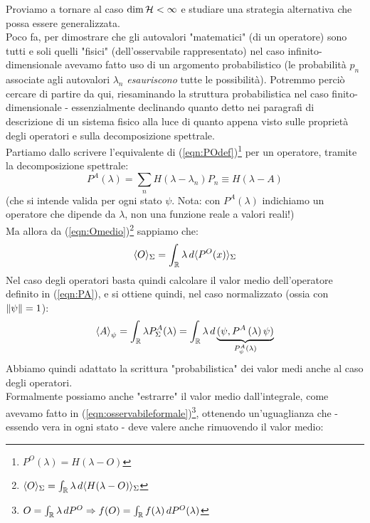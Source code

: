 Proviamo a tornare al caso $\operatorname{dim}\mathcal{H} < \infty$ e studiare una strategia alternativa che possa essere generalizzata.\\
Poco fa, per dimostrare che gli autovalori "matematici" (di un operatore) sono tutti e soli quelli "fisici" (dell'osservabile rappresentato) nel caso infinito-dimensionale avevamo fatto uso di un argomento probabilistico (le probabilità $p_n$ associate agli autovalori $\lambda_n$ \textit{esauriscono} tutte le possibilità). Potremmo perciò cercare di partire da qui, riesaminando la struttura probabilistica nel caso finito-dimensionale - essenzialmente declinando quanto detto nei paragrafi di descrizione di un sistema fisico %
alla luce di quanto appena visto sulle proprietà degli operatori e sulla decomposizione spettrale.\\
Partiamo dallo scrivere l'equivalente di (\ref{eqn:POdef})\footnote{$P^O(\lambda) = H(\lambda-O)$} per un operatore, tramite la decomposizione spettrale: %
\begin{equation} 
P^A\left(\lambda\right)=\sum_{n}{H\left(\lambda-\lambda_n\right)P_n}\equiv H(\lambda-A) 
\label{eqn:PA}
\end{equation}
(che si intende valida per ogni stato $\psi$. Nota: con $P^A(\lambda)$ indichiamo un operatore che dipende da $\lambda$, non una funzione reale a valori reali!)\\
Ma allora da (\ref{eqn:Omedio})\footnote{$\langle O \rangle_\Sigma = \int_{\mathbb{R}} \lambda\, d\langle H(\lambda-O)\rangle_\Sigma$} sappiamo che: %
\[
\langle O \rangle_\Sigma = \int_{\mathbb{R}} \lambda\, d\langle P^O(x)\rangle_\Sigma 
\]
Nel caso degli operatori basta quindi calcolare il valor medio dell'operatore definito in (\ref{eqn:PA}), e si ottiene quindi, nel caso normalizzato (ossia con $\left\lVert\psi\right\rVert = 1$):
\begin{equation}
\left\langle A\right\rangle_\psi= \int_{\mathbb{R}} \lambda P^A_\Sigma(\lambda) =\int_{\mathbb{R}}{\lambda\, d \underbrace{(\psi,P^A\left(\lambda\right)\psi)}_{P_\psi^A(\lambda)}}
\label{eqn:valormedioA}
\end{equation}
Abbiamo quindi adattato la scrittura "probabilistica" dei valor medi anche al caso degli operatori.\\
Formalmente possiamo anche "estrarre" il valor medio dall'integrale, come avevamo fatto in (\ref{eqn:osservabileformale})\footnote{$O = \int_{\mathbb{R}} \lambda\, dP^O \Rightarrow f(O) = \int_{\mathbb{R}} f(\lambda)\, dP^O(\lambda)$}, ottenendo un'uguaglianza che - essendo vera in ogni stato - deve valere anche rimuovendo il valor medio: %
